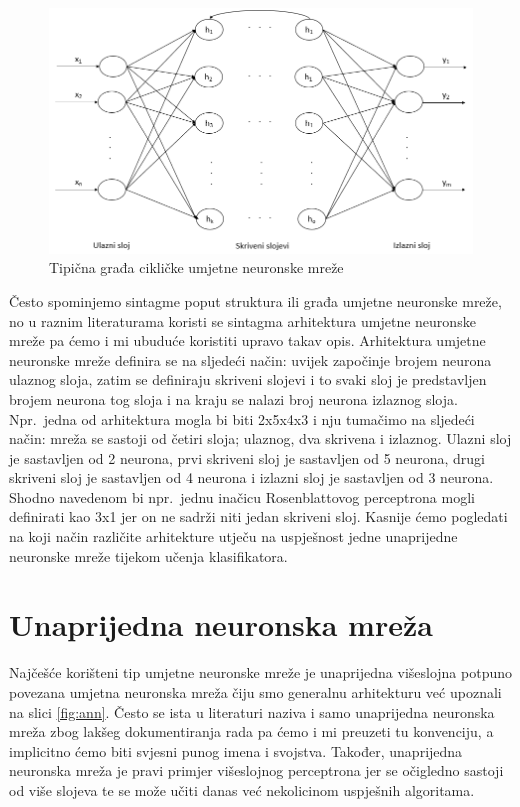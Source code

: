 \documentclass[times, utf8, zavrsni]{fer}
\begin{document}
\begin{figure}[H]
    \centering
    \includegraphics[scale=0.6]{img/cycle-ann.png}
    \caption[Caption for LOF]{Tipična građa cikličke umjetne neuronske mreže\footnotemark}
    \label{fig:cyclic-ann}
\end{figure}

Često spominjemo sintagme poput struktura ili građa umjetne neuronske mreže, no u raznim literaturama koristi se sintagma arhitektura umjetne neuronske mreže pa ćemo i mi ubuduće koristiti upravo takav opis. Arhitektura umjetne neuronske mreže definira se na sljedeći način: uvijek započinje brojem neurona ulaznog sloja, zatim se definiraju skriveni slojevi i to svaki sloj je predstavljen brojem neurona tog sloja i na kraju se nalazi broj neurona izlaznog sloja. Npr.\ jedna od arhitektura mogla bi biti 2x5x4x3 i nju tumačimo na sljedeći način: mreža se sastoji od četiri sloja; ulaznog, dva skrivena i izlaznog. Ulazni sloj je sastavljen od 2 neurona, prvi skriveni sloj je sastavljen od 5 neurona, drugi skriveni sloj je sastavljen od 4 neurona i izlazni sloj je sastavljen od 3 neurona. Shodno navedenom bi npr.\ jednu inačicu Rosenblattovog perceptrona mogli definirati kao 3x1 jer on ne sadrži niti jedan skriveni sloj. Kasnije ćemo pogledati na koji način različite arhitekture utječu na uspješnost jedne unaprijedne neuronske mreže tijekom učenja klasifikatora.

\section{Unaprijedna neuronska mreža}
Najčešće korišteni tip umjetne neuronske mreže je unaprijedna višeslojna potpuno povezana umjetna neuronska mreža  čiju smo generalnu arhitekturu već upoznali na slici \ref{fig:ann}. Često se ista u literaturi naziva i samo unaprijedna neuronska mreža zbog lakšeg dokumentiranja rada pa ćemo i mi preuzeti tu konvenciju, a implicitno ćemo biti svjesni punog imena i svojstva. Također, unaprijedna neuronska mreža je pravi primjer višeslojnog perceptrona jer se očigledno sastoji od više slojeva te se može učiti danas već nekolicinom uspješnih algoritama.
\end{document}
